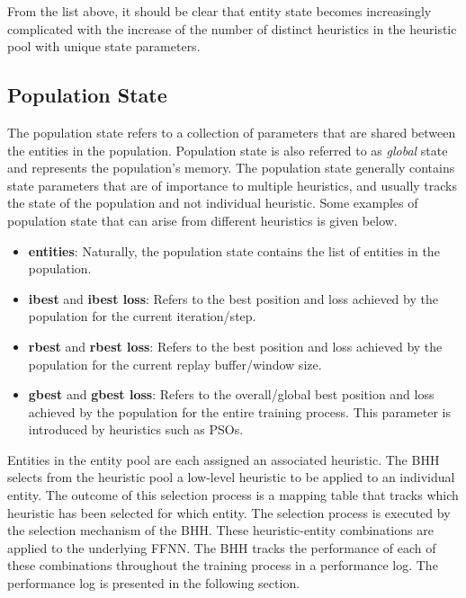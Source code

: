 From the list above, it should be clear that entity state becomes increasingly complicated with the increase of the number of distinct heuristics in the heuristic pool with unique state parameters.

\subsection{Population State}\label{sec:bhh:entity_pool:population_state}

The population state refers to a collection of parameters that are shared between the entities in the population. Population state is also referred to as \textit{global} state and represents the population's memory. The population state generally contains state parameters that are of importance to multiple heuristics, and usually tracks the state of the population and not individual heuristic. Some examples of population state that can arise from different heuristics is given below.

\begin{itemize}
      \item \textbf{entities}: Naturally, the population state contains the list of entities in the population.

      \item \textbf{ibest} and \textbf{ibest loss}: Refers to the best position and loss achieved by the population for the current iteration/step.

      \item \textbf{rbest} and \textbf{rbest loss}: Refers to the best position and loss achieved by the population for the current replay buffer/window size.

      \item \textbf{gbest} and \textbf{gbest loss}: Refers to the overall/global best position and loss achieved by the population for the entire training process. This parameter is introduced by heuristics such as \acp{PSO}.
\end{itemize}

Entities in the entity pool are each assigned an associated heuristic. The \acs{BHH} selects from the heuristic pool a low-level heuristic to be applied to an individual entity. The outcome of this selection process is a mapping table that tracks which heuristic has been selected for which entity. The selection process is executed by the selection mechanism of the \acs{BHH}. These heuristic-entity combinations are applied to the underlying \acs{FFNN}. The \acs{BHH} tracks the performance of each of these combinations throughout the training process in a performance log. The performance log is presented in the following section.


